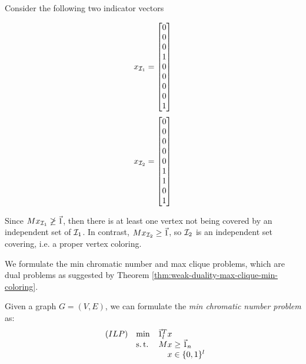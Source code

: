 \begin{exm}
    Consider the following two indicator vectors
    \begin{multicols}{2}
        \noindent\[
            x_{\mathcal{I}_1} = \begin{bmatrix} 
                                0 \\ 0 \\ 0 \\ 1 \\ 0 \\ 0 \\ 0 \\ 0 \\ 1
                            \end{bmatrix}
        \]
        \noindent\[ 
            x_{\mathcal{I}_2} = \begin{bmatrix} 
                                0 \\ 0 \\ 0 \\ 0 \\ 0 \\ 1 \\ 1 \\ 0 \\ 1
                            \end{bmatrix}
        \]
    \end{multicols}
    Since $Mx_{\mathcal{I}_1} \not\ge \Vec{1}$, then there is at least one vertex not being covered by an independent set of $\mathcal{I}_1$. In contrast, $Mx_{\mathcal{I}_2} \ge \Vec{1}$, so $\mathcal{I}_2$ is an independent set covering, i.e. a proper vertex coloring.
\end{exm}

We formulate the min chromatic number and max clique problems, which are dual problems as suggested by Theorem \ref{thm:weak-duality-max-clique-min-coloring}.

\begin{defn}
    \label{def:min-chromatic-number-formulation}
    Given a graph $G = (V,E)$, we can formulate the \textit{min chromatic number problem} as:
        \begin{equation*}
            \begin{array}{llr@{}l@{}}
                (ILP)   & \min  &   \one_l^T x  &               \\
                        & \st   &       Mx      &{}\ge \one_n   \\
                        &       &       x       &{}\in \{0,1\}^l
            \end{array}
        \end{equation*}
\end{defn}

